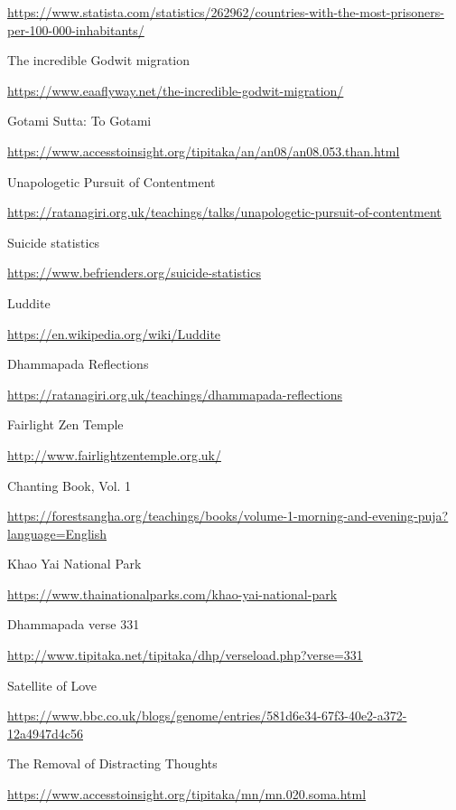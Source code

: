 \begin{thebibliography}{9}
  {\urlsize \url{https://www.statista.com/statistics/262962/countries-with-the-most-prisoners-per-100-000-inhabitants/}}

 The incredible Godwit migration

  {\urlsize \url{https://www.eaaflyway.net/the-incredible-godwit-migration/}}

 Gotami Sutta: To Gotami

  {\urlsize \url{https://www.accesstoinsight.org/tipitaka/an/an08/an08.053.than.html}}

 Unapologetic Pursuit of Contentment

  {\urlsize \url{https://ratanagiri.org.uk/teachings/talks/unapologetic-pursuit-of-contentment}}

 Suicide statistics

  {\urlsize \url{https://www.befrienders.org/suicide-statistics}}

 Luddite

  {\urlsize \url{https://en.wikipedia.org/wiki/Luddite}}

 Dhammapada Reflections

  {\urlsize \url{https://ratanagiri.org.uk/teachings/dhammapada-reflections}}

 Fairlight Zen Temple

  {\urlsize \url{http://www.fairlightzentemple.org.uk/}}

 Chanting Book, Vol. 1

  {\urlsize \url{https://forestsangha.org/teachings/books/volume-1-morning-and-evening-puja?language=English}}

 Khao Yai National Park

  {\urlsize \url{https://www.thainationalparks.com/khao-yai-national-park}}

 Dhammapada verse 331

  {\urlsize \url{http://www.tipitaka.net/tipitaka/dhp/verseload.php?verse=331}}

 Satellite of Love

  {\urlsize \url{https://www.bbc.co.uk/blogs/genome/entries/581d6e34-67f3-40e2-a372-12a4947d4c56}}

 The Removal of Distracting Thoughts

  {\urlsize \url{https://www.accesstoinsight.org/tipitaka/mn/mn.020.soma.html}}


\end{thebibliography}
